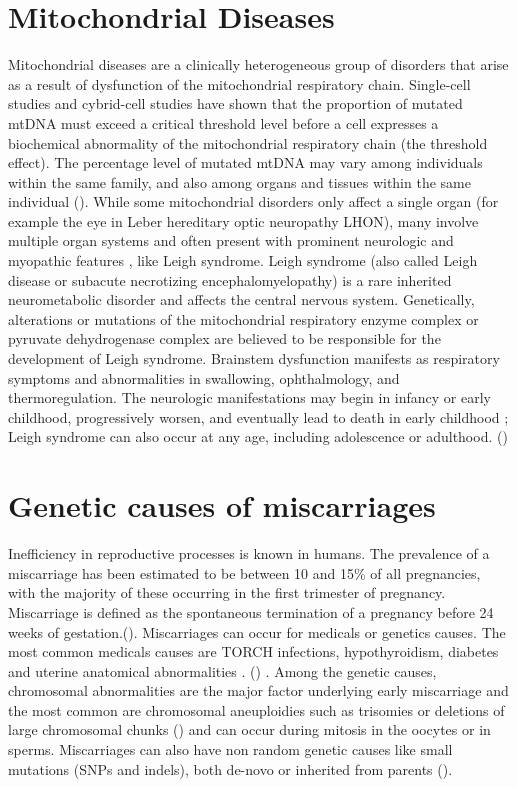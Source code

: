 \section{Mitochondrial Diseases}
Mitochondrial diseases are a clinically heterogeneous group of disorders that arise as a result of dysfunction of
the mitochondrial respiratory chain.
Single-cell studies and cybrid-cell studies have shown that the proportion of mutated mtDNA must exceed a critical threshold level before a cell expresses a biochemical abnormality of the mitochondrial respiratory chain (the threshold effect). The percentage level of mutated mtDNA may vary among individuals within the same family, and also among organs and tissues within the same individual (\cite{chinnery2014mitochondrial, thorburn2017mitochondrial}). 
While some mitochondrial disorders only affect a single organ (for example the eye in Leber hereditary optic neuropathy LHON), many involve multiple organ systems and often present with prominent neurologic and myopathic features , like Leigh syndrome.
Leigh syndrome (also called Leigh disease or subacute necrotizing
encephalomyelopathy) is a rare inherited neurometabolic disorder
and affects the central nervous system. 
Genetically, alterations or mutations of the mitochondrial respiratory enzyme complex or pyruvate dehydrogenase complex are believed to be responsible for the development of Leigh syndrome.
Brainstem dysfunction manifests as respiratory symptoms and abnormalities in swallowing, ophthalmology, and thermoregulation. 
The neurologic manifestations may begin in infancy or early
childhood, progressively worsen, and eventually lead to death in
early childhood ; Leigh syndrome can also occur at any age, including adolescence or adulthood.
(\cite{chang2020meta})


\section{Genetic causes of miscarriages}
Inefficiency in reproductive processes is known in humans. The prevalence of a miscarriage has been estimated to be between 10 and 15\% of all pregnancies, with the majority of these occurring in the first trimester of pregnancy.
Miscarriage is defined as the spontaneous termination of a pregnancy before 24 weeks of gestation.(\cite{larsen2013new , goddijn2000genetic}).
Miscarriages can occur for medicals or genetics causes. The most common medicals causes are TORCH infections, hypothyroidism,  diabetes and  uterine  anatomical  abnormalities . (\cite{najafi2019chromosomal}) . Among the genetic causes, chromosomal abnormalities are the major factor underlying early miscarriage and the most common are chromosomal aneuploidies such as trisomies or deletions of large chromosomal chunks (\cite{zhang2009genetic}) and can occur during mitosis in the oocytes or in sperms. Miscarriages can also have non random genetic causes like small mutations (SNPs and indels), both de-novo or inherited from parents (\cite{larsen2013new}).

